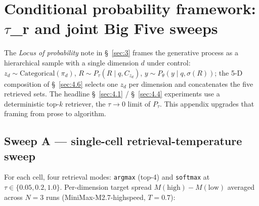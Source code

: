 \section{Conditional probability framework: $\tau$\_r and joint Big Five sweeps}
\label{app:C}

The \textit{Locus of probability} note in \S~\ref{sec:3} frames the generative process as a hierarchical sample with a single dimension $d$ under control: $z_d \sim \mathrm{Categorical}(\pi_d)$, $R \sim P_\tau(R \mid q, C_{z_d})$, $y \sim P_\theta(y \mid q, \sigma(R))$; the 5-D composition of \S~\ref{sec:4.6} selects one $z_d$ per dimension and concatenates the five retrieved sets. The headline \S~\ref{sec:4.1} / \S~\ref{sec:4.4} experiments use a deterministic top-$k$ retriever, the $\tau \to 0$ limit of $P_\tau$. This appendix upgrades that framing from prose to algorithm.

\subsection{Sweep A --- single-cell retrieval-temperature sweep}
\label{app:C.1}

For each cell, four retrieval modes: \texttt{argmax} (top-4) and \texttt{softmax} at $\tau \in \{0.05, 0.2, 1.0\}$. Per-dimension target spread $M(\text{high}) - M(\text{low})$ averaged across $N = 3$ runs (MiniMax-M2.7-highspeed, $T = 0.7$):

\begin{table}[t]
\centering
{}
\caption{Sweep A: per-dim Mini-IPIP target spread under deterministic top-$k$ vs softmax retrieval at three temperatures. Spread decays only $-12.7\%$ across the entire $\tau$ range, evidencing that the CAPS effect is a structural property of the corpus rather than of the deterministic top-$k$ choice.}
\label{tab:tau-sweep}
\end{table}

